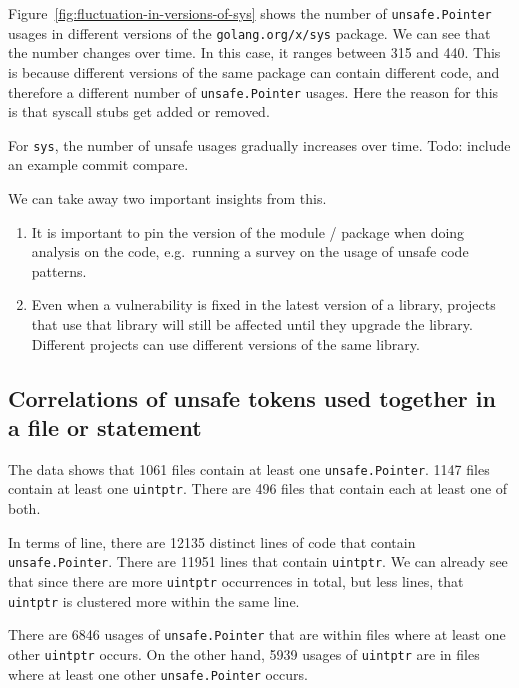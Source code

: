 Figure~\ref{fig:fluctuation-in-versions-of-sys} shows the number of \texttt{unsafe.Pointer} usages in different versions
of the \texttt{golang.org/x/sys} package.
We can see that the number changes over time.
In this case, it ranges between 315 and 440.
This is because different versions of the same package can contain different code, and therefore a different number of
\texttt{unsafe.Pointer} usages.
Here the reason for this is that syscall stubs get added or removed.

For \texttt{sys}, the number of unsafe usages gradually increases over time.
Todo: include an example commit compare.

We can take away two important insights from this.

\begin{enumerate}
    \item It is important to pin the version of the module / package when doing analysis on the code, e.g.\ running a
    survey on the usage of unsafe code patterns.
    \item Even when a vulnerability is fixed in the latest version of a library, projects that use that library will
    still be affected until they upgrade the library.
    Different projects can use different versions of the same library.
\end{enumerate}


\subsection{Correlations of unsafe tokens used together in a file or statement}\label{subsec:results-correlation-together}

The data shows that 1061 files contain at least one \texttt{unsafe.Pointer}.
1147 files contain at least one \texttt{uintptr}.
There are 496 files that contain each at least one of both.

In terms of line, there are 12135 distinct lines of code that contain \texttt{unsafe.Pointer}.
There are 11951 lines that contain \texttt{uintptr}.
We can already see that since there are more \texttt{uintptr} occurrences in total, but less lines, that \texttt{uintptr}
is clustered more within the same line.

There are 6846 usages of \texttt{unsafe.Pointer} that are within files where at least one other \texttt{uintptr} occurs.
On the other hand, 5939 usages of \texttt{uintptr} are in files where at least one other \texttt{unsafe.Pointer} occurs.

